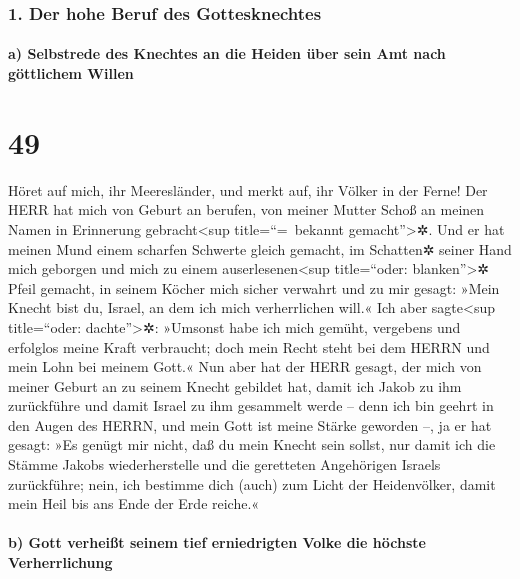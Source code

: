 \hypertarget{der-hohe-beruf-des-gottesknechtes}{%
\subsubsection{1. Der hohe Beruf des
Gottesknechtes}\label{der-hohe-beruf-des-gottesknechtes}}

\hypertarget{a-selbstrede-des-knechtes-an-die-heiden-uxfcber-sein-amt-nach-guxf6ttlichem-willen}{%
\paragraph{a) Selbstrede des Knechtes an die Heiden über sein Amt nach
göttlichem
Willen}\label{a-selbstrede-des-knechtes-an-die-heiden-uxfcber-sein-amt-nach-guxf6ttlichem-willen}}

\hypertarget{section-48}{%
\section{49}\label{section-48}}

Höret auf mich, ihr Meeresländer, und merkt auf, ihr
Völker in der Ferne! Der HERR hat mich von Geburt an berufen, von meiner
Mutter Schoß an meinen Namen in Erinnerung gebracht\textless sup
title=``=~bekannt gemacht''\textgreater✲. Und er hat
meinen Mund einem scharfen Schwerte gleich gemacht, im Schatten✲ seiner
Hand mich geborgen und mich zu einem auserlesenen\textless sup
title=``oder: blanken''\textgreater✲ Pfeil gemacht, in seinem Köcher
mich sicher verwahrt und zu mir gesagt: »Mein Knecht bist
du, Israel, an dem ich mich verherrlichen will.« Ich aber
sagte\textless sup title=``oder: dachte''\textgreater✲: »Umsonst habe
ich mich gemüht, vergebens und erfolglos meine Kraft verbraucht; doch
mein Recht steht bei dem HERRN und mein Lohn bei meinem Gott.«
Nun aber hat der HERR gesagt, der mich von meiner Geburt
an zu seinem Knecht gebildet hat, damit ich Jakob zu ihm zurückführe und
damit Israel zu ihm gesammelt werde -- denn ich bin geehrt in den Augen
des HERRN, und mein Gott ist meine Stärke geworden --, ja
er hat gesagt: »Es genügt mir nicht, daß du mein Knecht sein sollst, nur
damit ich die Stämme Jakobs wiederherstelle und die geretteten
Angehörigen Israels zurückführe; nein, ich bestimme dich (auch) zum
Licht der Heidenvölker, damit mein Heil bis ans Ende der Erde reiche.«

\hypertarget{b-gott-verheiuxdft-seinem-tief-erniedrigten-volke-die-huxf6chste-verherrlichung}{%
\paragraph{b) Gott verheißt seinem tief erniedrigten Volke die höchste
Verherrlichung}\label{b-gott-verheiuxdft-seinem-tief-erniedrigten-volke-die-huxf6chste-verherrlichung}}

